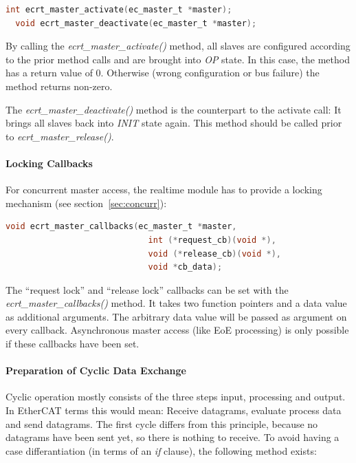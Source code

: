 \documentclass[a4paper,12pt,BCOR6mm,bibtotoc,idxtotoc]{scrbook}
\begin{document}
\begin{lstlisting}[language=C]
  int ecrt_master_activate(ec_master_t *master);
  void ecrt_master_deactivate(ec_master_t *master);
\end{lstlisting}

By calling the \textit{ecrt\_master\_activate()} method, all slaves
are configured according to the prior method calls and are brought
into \textit{OP} state. In this case, the method has a return value of
0. Otherwise (wrong configuration or bus failure) the method returns
non-zero.

The \textit{ecrt\_master\_deactivate()} method is the counterpart to
the activate call: It brings all slaves back into \textit{INIT} state
again. This method should be called prior to
\textit{ecrt\_\-master\_\-release()}.

\paragraph{Locking Callbacks}

For concurrent master access, the realtime module has to provide a
locking mechanism (see section~\ref{sec:concurr}):

\begin{lstlisting}[language=C]
  void ecrt_master_callbacks(ec_master_t *master,
                             int (*request_cb)(void *),
                             void (*release_cb)(void *),
                             void *cb_data);
\end{lstlisting}

The ``request lock'' and ``release lock'' callbacks can be set with
the \textit{ecrt\_master\_call\-backs()} method. It takes two function
pointers and a data value as additional arguments. The arbitrary data
value will be passed as argument on every callback. Asynchronous
master access (like EoE processing) is only possible if these
callbacks have been set.

\paragraph{Preparation of Cyclic Data Exchange}

Cyclic operation mostly consists of the three steps input, processing
and output. In EtherCAT terms this would mean: Receive datagrams,
evaluate process data and send datagrams. The first cycle differs from
this principle, because no datagrams have been sent yet, so there is
nothing to receive. To avoid having a case differantiation (in terms
of an \textit{if} clause), the following method exists:
\end{document}

